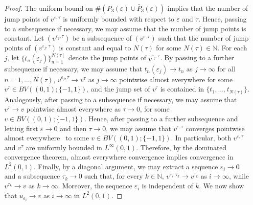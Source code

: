 \documentclass[10pt,a4paper]{amsart}
\newcommand{\N}{\mathbb{N}}
\begin{document}
\begin{proof}
The uniform bound on $\#(P_{3}(\varepsilon)\cup \bar{P}_{3}(\varepsilon))$ implies that the number of jump points of $v^{\varepsilon,\tau}$ is uniformly bounded with respect to $\varepsilon$ and $\tau$. Hence, passing to a subsequence if necessary, we may assume that the number of jump points is constant. Let $(v^{\varepsilon_{j},\tau})$ be a subsequence of $(v^{\varepsilon,\tau})$ such that the number of jump points of $(v^{\varepsilon_{j},\tau})$ is constant and equal to $N({\tau})$ for some $N({\tau}) \in \mathbb{N}$. For each $j$, let $\{t_n(\varepsilon_j)\}_{n=1}^{N(\tau)}$ denote the jump points of $v^{\varepsilon_j,\tau}$. By passing to a further subsequence if necessary, we may assume that
$t_n(\varepsilon_j)\to t_n$ as $j\to\infty$ for all $n=1,\ldots,N(\tau)$, $v^{\varepsilon_j,\tau}\to v^{\tau}$ as $j\to\infty$ pointwise almost everywhere for some $v^{\tau}\in BV((0,1);\{-1,1\})$, and the jump set of $v^{\tau}$ is contained in $\{t_1,\ldots,t_{N(\tau)}\}$. 
Analogously, after passing to a subsequence if necessary, we may assume that $v^{\tau}\to v$ pointwise almost everywhere as $\tau\to 0$, for some $v\in BV((0,1);\{-1,1\})$. Hence, after passing to a further subsequence and letting first $\varepsilon\to0$ and then $\tau\to0$, we may assume that $v^{\varepsilon,\tau}$ converges pointwise almost everywhere \ to some $v \in BV((0,1);\{-1,1\})$. In particular, both $v^{\varepsilon,\tau}$ and $v^{\tau}$ are uniformly bounded in $L^{\infty}(0,1)$. Therefore, by the dominated convergence theorem, almost everywhere convergence implies convergence in $L^{2}(0,1)$. Finally, by a diagonal argument, we may extract a sequence $\varepsilon_i\to0$ and a subsequence $\tau_k\to0$ such that, for every $k\in\N$, $v^{\varepsilon_i,\tau_k}\to v^{\tau_k}$ as $i\to\infty$, while $v^{\tau_k}\to v$ as $k\to\infty$. Moreover, the sequence $\varepsilon_i$ is independent of $k$. We now show that $u_{\varepsilon_i}\to v$ as $i\to\infty$ in $L^{2}(0,1)$.


\end{proof}
\end{document}
